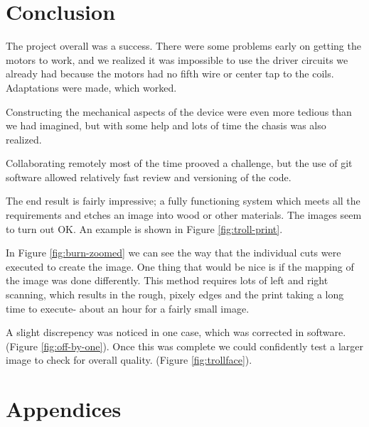 \documentclass[11pt]{LaTeX-Classes/math-hw}
\begin{document}
\section{Conclusion}
The project overall was a success. There were some problems early on getting the motors to work,
and we realized it was impossible to use the driver circuits we already had because the motors
had no fifth wire or center tap to the coils. Adaptations were made, which worked.

Constructing the mechanical aspects of the device were even more tedious than we had imagined,
but with some help and lots of time the chasis was also realized. 

Collaborating remotely most of the time prooved a challenge, but the use of git software allowed
relatively fast review and versioning of the code.

The end result is fairly impressive; a fully functioning system which meets all the requirements
and etches an image into wood or other materials.
The images seem to turn out OK. An example is shown in Figure \ref{fig:troll-print}.

In Figure \ref{fig:burn-zoomed} we can see the way that the individual cuts were executed to
create the image. One thing that would be nice is if the mapping of the image was done differently.
This method requires lots of left and right scanning, which results in the rough, pixely edges
and the print taking a long time to execute- about an hour for a fairly small image.

A slight discrepency was noticed in one case, which was corrected in software.
(Figure \ref{fig:off-by-one}).
Once this was complete we could confidently test a larger image to check for overall quality.
(Figure \ref{fig:trollface}).

\section*{Appendices}
\end{document}
